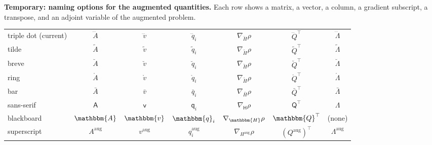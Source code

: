 \documentclass[a4paper,12pt]{article}
\theoremstyle{definition}
\begin{document}
{\color{red}\small\noindent\textbf{Temporary: naming options for the augmented quantities.} Each row shows a matrix, a vector, a column, a gradient subscript, a transpose, and an adjoint variable of the augmented problem.
\begin{center}
\begin{tabular}{lcccccc}
triple dot (current) & $\dddot{A}$ & $\dddot{v}$ & $\dddot{q}_i$ & $\nabla_{\dddot{H}}\rho$ & $\dddot{Q}^\top$ & $\dddot{\Lambda}$ \\
tilde & $\tilde{A}$ & $\tilde{v}$ & $\tilde{q}_i$ & $\nabla_{\tilde{H}}\rho$ & $\tilde{Q}^\top$ & $\tilde{\Lambda}$ \\
breve & $\breve{A}$ & $\breve{v}$ & $\breve{q}_i$ & $\nabla_{\breve{H}}\rho$ & $\breve{Q}^\top$ & $\breve{\Lambda}$ \\
ring & $\mathring{A}$ & $\mathring{v}$ & $\mathring{q}_i$ & $\nabla_{\mathring{H}}\rho$ & $\mathring{Q}^\top$ & $\mathring{\Lambda}$ \\
bar & $\bar{A}$ & $\bar{v}$ & $\bar{q}_i$ & $\nabla_{\bar{H}}\rho$ & $\bar{Q}^\top$ & $\bar{\Lambda}$ \\
sans-serif & $\mathsf{A}$ & $\mathsf{v}$ & $\mathsf{q}_i$ & $\nabla_{\mathsf{H}}\rho$ & $\mathsf{Q}^\top$ & $\mathsf{\Lambda}$ \\
blackboard & $\mathbbm{A}$ & $\mathbbm{v}$ & $\mathbbm{q}_i$ & $\nabla_{\mathbbm{H}}\rho$ & $\mathbbm{Q}^\top$ & (none) \\
superscript & $A^{\mathrm{aug}}$ & $v^{\mathrm{aug}}$ & $q^{\mathrm{aug}}_i$ & $\nabla_{H^{\mathrm{aug}}}\rho$ & $(Q^{\mathrm{aug}})^\top$ & $\Lambda^{\mathrm{aug}}$ \\
\end{tabular}
\end{center}}
\end{document}
